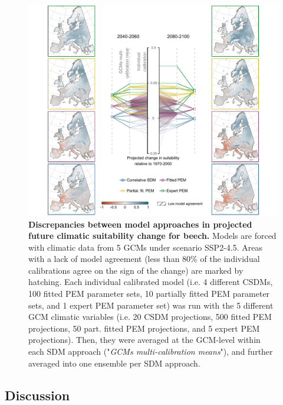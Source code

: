 \begin{figure}
\centering
\hspace*{-1cm}
\includegraphics[width = 22cm]{chapter4/figs/fagus_cascade-1.pdf}
\caption{\textbf{Discrepancies between model approaches in projected future climatic suitability change for beech.} Models are forced with climatic data from 5 GCMs under scenario SSP2-4.5. Areas with a lack of model agreement (less than 80\% of the individual calibrations agree on the sign of the change) are marked by hatching. Each individual calibrated model (i.e. 4 different CSDMs, 100 fitted PEM parameter sets, 10 partially fitted PEM parameter sets, and 1 expert PEM parameter set) was run with the 5 different GCM climatic variables (i.e. 20 CSDM projections, 500 fitted PEM projections, 50 part. fitted PEM projections, and 5 expert PEM projections). Then, they were averaged at the GCM-level within each SDM approach ("\emph{GCMs multi-calibration means}"), and further averaged into one ensemble per SDM approach.}
\label{fig:cascade}
\end{figure}

\subsection{Discussion}

